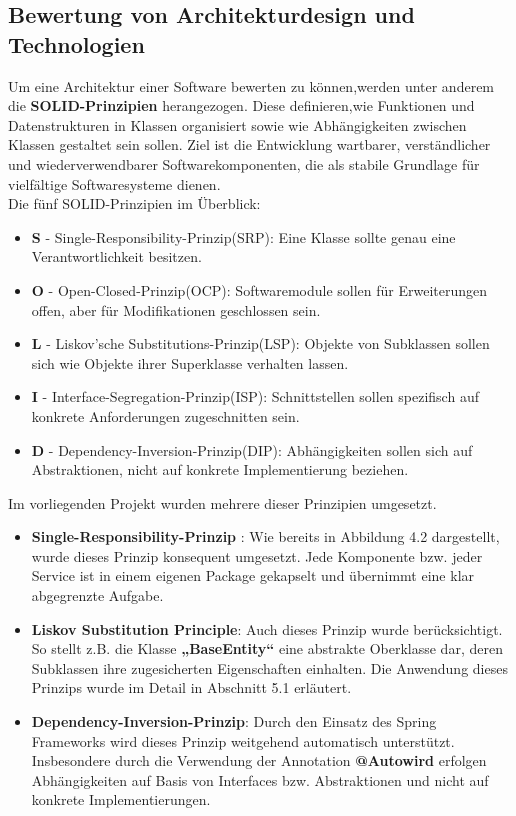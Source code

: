 \documentclass[a4paper,12pt]{scrreprt}
\begin{document}
\subsection{Bewertung von Architekturdesign und Technologien}
Um eine Architektur einer Software bewerten zu können,werden unter anderem die \textbf{SOLID-Prinzipien} herangezogen. Diese definieren,wie Funktionen und Datenstrukturen in Klassen organisiert sowie wie Abhängigkeiten zwischen Klassen gestaltet sein sollen. Ziel ist die Entwicklung wartbarer, verständlicher und wiederverwendbarer Softwarekomponenten, die als stabile Grundlage für vielfältige Softwaresysteme dienen.\\
Die fünf SOLID-Prinzipien im Überblick:
\begin{itemize}
	\item \textbf{S} - Single-Responsibility-Prinzip(SRP): Eine Klasse sollte genau eine Verantwortlichkeit besitzen.
	\item \textbf{O} - Open-Closed-Prinzip(OCP): Softwaremodule sollen für Erweiterungen offen, aber für Modifikationen geschlossen sein.
	\item \textbf{L} - Liskov’sche Substitutions-Prinzip(LSP): Objekte von Subklassen sollen sich wie Objekte ihrer Superklasse verhalten lassen. 
	\item \textbf{I} - Interface-Segregation-Prinzip(ISP): Schnittstellen sollen spezifisch auf konkrete Anforderungen zugeschnitten sein.
	\item \textbf{D} - Dependency-Inversion-Prinzip(DIP): Abhängigkeiten sollen sich auf Abstraktionen, nicht auf konkrete Implementierung beziehen.
\end{itemize}
Im vorliegenden Projekt wurden mehrere dieser Prinzipien umgesetzt.
\begin{itemize}
	\item \textbf{Single-Responsibility-Prinzip} : Wie bereits in Abbildung 4.2 dargestellt, wurde dieses Prinzip konsequent umgesetzt. Jede Komponente bzw. jeder Service ist in einem eigenen Package gekapselt und übernimmt eine klar abgegrenzte Aufgabe.
	\item \textbf{Liskov Substitution Principle}: Auch dieses Prinzip wurde berücksichtigt. So stellt z.B. die Klasse \textbf{„BaseEntity“} eine abstrakte Oberklasse dar, deren Subklassen ihre zugesicherten Eigenschaften einhalten. Die Anwendung dieses Prinzips wurde im Detail in Abschnitt 5.1 erläutert.
	\item \textbf{Dependency-Inversion-Prinzip}: Durch den Einsatz des Spring Frameworks wird dieses Prinzip weitgehend automatisch unterstützt. Insbesondere durch die Verwendung der Annotation \textbf{@Autowird} erfolgen Abhängigkeiten auf Basis von Interfaces bzw. Abstraktionen und nicht auf konkrete Implementierungen.
\end{itemize}
\end{document}
